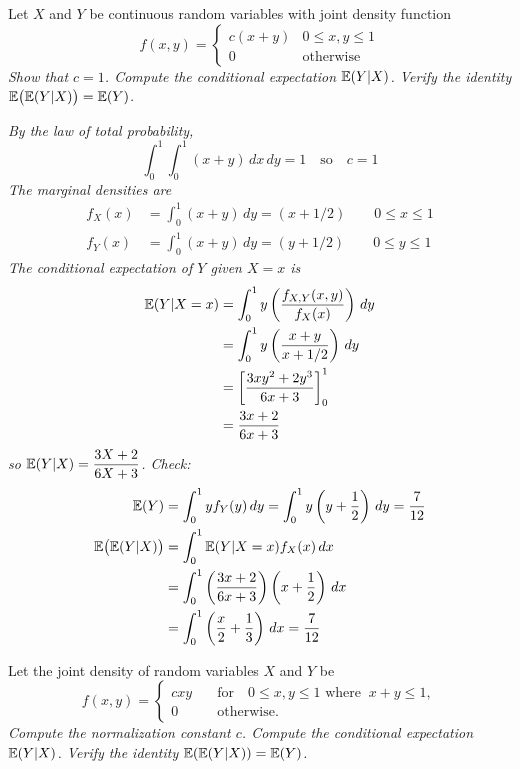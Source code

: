 \begin{exercise}
\begin{questions}
\question
Let $X$ and $Y$ be continuous random variables with joint density function
\[
f(x,y) = 
\begin{cases}
	c(x+y) & 0\leq x,y\leq 1 \\
	0		& \text{otherwise}
\end{cases}
\]
\ben
\it Show that $c=1$. 
\it Compute the conditional expectation $\mathbb{E}(Y|X)$.
\it Verify the identity $\mathbb{E}\big(\mathbb{E}(Y|X)\big) = \mathbb{E}(Y)$.
\een
\begin{answer}
\ben
\it %
By the law of total probability,
\[
\int_0^1\int_0^1(x+y)\,dx\,dy = 1 \quad\text{so}\quad c = 1
\]
\it %
The marginal densities are
\begin{align*}
f_X(x)	& = \int_0^1(x+y)\,dy = (x+1/2) \qquad 0\leq x\leq 1 \\
f_Y(x)	& = \int_0^1(x+y)\,dy = (y+1/2) \qquad 0\leq y\leq 1 
\end{align*}
The conditional expectation of $Y$ given $X=x$ is
\begin{align*}
\mathbb{E}(Y|X=x)
	& = \int_0^1 y\left(\frac{f_{X,Y}(x,y)}{f_X(x)}\right)\,dy \\
	& = \int_0^1 y\left(\frac{x+y}{x+1/2}\right)\,dy \\
	& = \left[\frac{3xy^2 + 2y^3}{6x+3}\right]_0^1 \\
	& = \frac{3x+2}{6x+3}
\end{align*}
so $\displaystyle\mathbb{E}(Y|X) = \frac{3X+2}{6X+3}$.
\it %
Check:
\begin{align*}
\mathbb{E}(Y)
	& = \int_0^1 y f_Y(y)\,dy 
	  = \int_0^1 y\left(y+\frac{1}{2}\right)\,dy = \frac{7}{12} \\
\mathbb{E}\big(\mathbb{E}(Y|X)\big)
	& = \int_0^1 \mathbb{E}(Y|X=x)f_X(x)\,dx \\
	& = \int_0^1 \left(\frac{3x+2}{6x+3}\right)\left(x+\frac{1}{2}\right)\,dx \\
	& = \int_0^1 \left(\frac{x}{2}+\frac{1}{3}\right)\,dx
		= \frac{7}{12}
\end{align*}
\een
\end{answer} 

\question
Let the joint density of random variables $X$ and $Y$ be 
\[
f(x,y) = \begin{cases}
	cxy & \quad\text{for}\quad 0\leq x,y\leq 1\text{ where }\ x+y\leq 1, \\
	0	& \quad\text{otherwise.}
\end{cases}
\]
\ben
\it Compute the normalization constant $c$. 
\it Compute the conditional expectation $\mathbb{E}(Y|X)$.
\it Verify the identity $\mathbb{E}(\mathbb{E}(Y|X))=\mathbb{E}(Y)$.
\een 


\end{questions}
\end{exercise}
